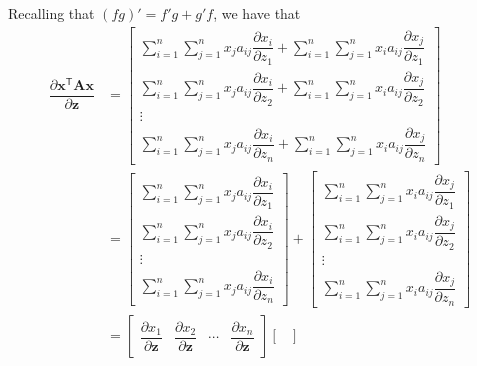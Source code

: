 \documentclass{article}
\newcommand{\trans}{\mathsf{T}}
\begin{document}
Recalling that \((fg)' = f'g + g'f\), we have that
\begin{align}
    \dfrac{\partial \mathbf{x}^\trans \mathbf{A} \mathbf{x}}{\partial \mathbf{z}} &= \begin{bmatrix}
        \displaystyle \sum_{i = 1}^{n}\sum_{j = 1}^{n} x_{j}a_{ij} \dfrac{\partial x_{i}}{\partial z_1} +
        \sum_{i = 1}^{n}\sum_{j = 1}^{n} x_{i}a_{ij} \dfrac{\partial x_{j}}{\partial z_1} \\ 
        \displaystyle \sum_{i = 1}^{n}\sum_{j = 1}^{n} x_{j}a_{ij} \dfrac{\partial x_{i}}{\partial z_2} +
        \sum_{i = 1}^{n}\sum_{j = 1}^{n} x_{i}a_{ij} \dfrac{\partial x_{j}}{\partial z_2} \\ 
        \vdots \\ 
        \displaystyle \sum_{i = 1}^{n}\sum_{j = 1}^{n} x_{j}a_{ij} \dfrac{\partial x_{i}}{\partial z_n} +
        \sum_{i = 1}^{n}\sum_{j = 1}^{n} x_{i}a_{ij} \dfrac{\partial x_{j}}{\partial z_n} 
    \end{bmatrix} \\
    &= \begin{bmatrix}
        \displaystyle \sum_{i = 1}^{n}\sum_{j = 1}^{n} x_{j}a_{ij} \dfrac{\partial x_{i}}{\partial z_1} \\
        \displaystyle \sum_{i = 1}^{n}\sum_{j = 1}^{n} x_{j}a_{ij} \dfrac{\partial x_{i}}{\partial z_2} \\
        \vdots \\ 
        \displaystyle \sum_{i = 1}^{n}\sum_{j = 1}^{n} x_{j}a_{ij} \dfrac{\partial x_{i}}{\partial z_n}
    \end{bmatrix} +
    \begin{bmatrix}
        \displaystyle \sum_{i = 1}^{n}\sum_{j = 1}^{n} x_{i}a_{ij} \dfrac{\partial x_{j}}{\partial z_1} \\ 
        \displaystyle \sum_{i = 1}^{n}\sum_{j = 1}^{n} x_{i}a_{ij} \dfrac{\partial x_{j}}{\partial z_2} \\ 
        \vdots \\ 
        \displaystyle \sum_{i = 1}^{n}\sum_{j = 1}^{n} x_{i}a_{ij} \dfrac{\partial x_{j}}{\partial z_n} 
    \end{bmatrix} \\
    &= \begin{bmatrix}
       \dfrac{\partial x_{1}}{\partial \mathbf{z}} & \dfrac{\partial x_{2}}{\partial \mathbf{z}} & \cdots  & \dfrac{\partial x_{n}}{\partial \mathbf{z}}
    \end{bmatrix}
    \begin{bmatrix}

\end{bmatrix}
\end{align}
\end{document}
